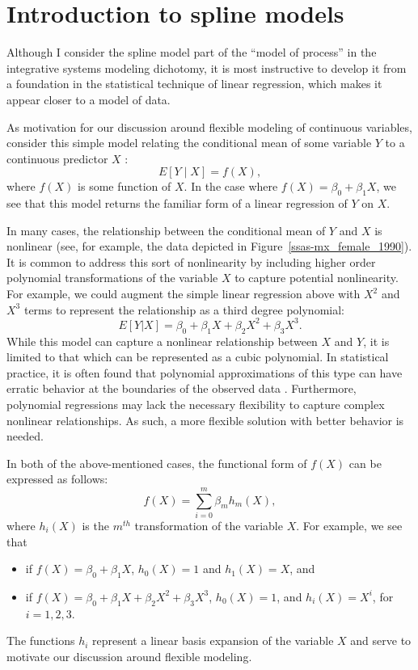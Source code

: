 \section{Introduction to spline models}

Although I consider the spline model part of the ``model of process''
in the integrative systems modeling dichotomy, it is most instructive
to develop it from a foundation in the statistical technique of linear
regression, which makes it appear closer to a model of data.

As motivation for our discussion around flexible modeling of
continuous variables, consider this simple model relating the
conditional mean of some variable $Y$ to a continuous predictor
$X$ :
\[
E[Y \mid X] = f(X),
\]
where $f(X)$ is some function of $X$. In the case where $f(X) =
\beta_0 + \beta_1 X$, we see that this model returns the familiar form
of a linear regression of $Y$ on $X$.

In many cases, the relationship between the conditional mean of $Y$
and $X$ is nonlinear (see, for example, the data depicted in
Figure~\ref{ssas-mx_female_1990}). It is common to address this sort
of nonlinearity by including higher order polynomial transformations
of the variable $X$ to capture potential nonlinearity. For example, we
could augment the simple linear regression above with $X^2$ and $X^3$
terms to represent the relationship as a third degree
polynomial:
\[
E[Y|X] = \beta_0 + \beta_1 X + \beta_2 X^2 + \beta_3 X^3.
\]
While this model can capture a nonlinear relationship between $X$ and
$Y$, it is limited to that which can be represented as a cubic
polynomial.  In statistical practice, it is often found that
polynomial approximations of this type can have erratic behavior at
the boundaries of the observed data \cite{ESL}. Furthermore,
polynomial regressions may lack the necessary flexibility to capture
complex nonlinear relationships. As such, a more flexible solution
with better behavior is needed.

In both of the above-mentioned cases, the functional form of $f(X)$
can be expressed as follows:
\[
f(X) = \sum_{i=0}^m\beta_m h_m(X),
\]
where $h_i(X)$ is the $m^{th}$ transformation of the variable $X$. For
example, we see that \begin{itemize} \item if $f(X) = \beta_0 +
  \beta_1 X$, $h_0(X)=1$ and $h_1(X) = X$, and \item if $f(X) =
  \beta_0 + \beta_1 X + \beta_2 X^2 + \beta_3 X^3$, $h_0(X) = 1$, and
  $h_i(X) = X^i$, for $i=1,2,3$. \end{itemize} The functions $h_i$
represent a linear basis expansion of the variable $X$ and serve to
motivate our discussion around flexible modeling.

